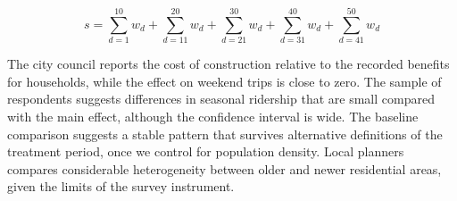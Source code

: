 \begin{equation}
  s = \sum_{d=1}^{10} w_{d} + \sum_{d=11}^{20} w_{d} + \sum_{d=21}^{30} w_{d} + \sum_{d=31}^{40} w_{d} + \sum_{d=41}^{50} w_{d}
\end{equation}

The city council reports the cost of construction relative to the recorded benefits for households, while the effect on weekend trips is close to zero. The sample of respondents suggests differences in seasonal ridership that are small compared with the main effect, although the confidence interval is wide. The baseline comparison suggests a stable pattern that survives alternative definitions of the treatment period, once we control for population density. Local planners compares considerable heterogeneity between older and newer residential areas, given the limits of the survey instrument.
